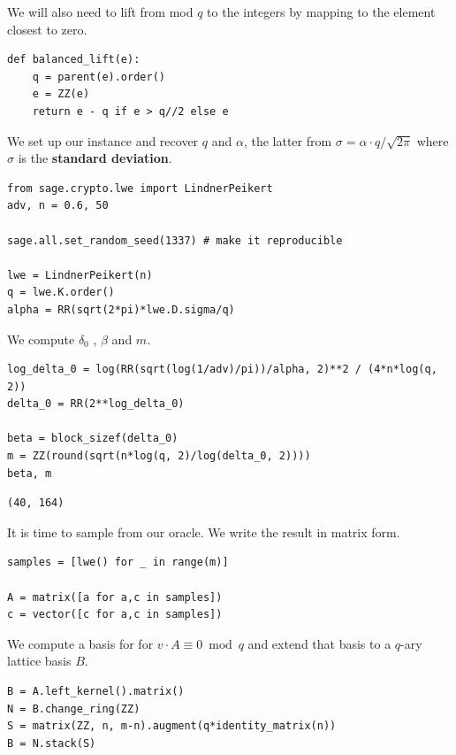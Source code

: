 \documentclass[10pt,a4paper,nobib]{tufte-handout}
\begin{document}
We will also need to lift from mod \(q\) to the integers by mapping to the element closest to zero.

\lstset{language=sage,label= ,caption= ,captionpos=b,numbers=none}
\begin{lstlisting}
def balanced_lift(e):
    q = parent(e).order()
    e = ZZ(e)
    return e - q if e > q//2 else e
\end{lstlisting}

We set up our instance and recover \(q\) and \(α\), the latter from \(σ = α⋅q/\sqrt{2π}\) where \(σ\) is the \textbf{standard deviation}.

\lstset{language=sage,label= ,caption= ,captionpos=b,numbers=none}
\begin{lstlisting}
from sage.crypto.lwe import LindnerPeikert
adv, n = 0.6, 50

sage.all.set_random_seed(1337) # make it reproducible

lwe = LindnerPeikert(n)
q = lwe.K.order()
alpha = RR(sqrt(2*pi)*lwe.D.sigma/q)
\end{lstlisting}

We compute \(δ_0\) , \(β\) and \(m\).

\lstset{language=sage,label= ,caption= ,captionpos=b,numbers=none}
\begin{lstlisting}
log_delta_0 = log(RR(sqrt(log(1/adv)/pi))/alpha, 2)**2 / (4*n*log(q, 2))
delta_0 = RR(2**log_delta_0)

beta = block_sizef(delta_0)
m = ZZ(round(sqrt(n*log(q, 2)/log(delta_0, 2))))
beta, m
\end{lstlisting}

\begin{verbatim}
(40, 164)
\end{verbatim}

It is time to sample from our oracle. We write the result in matrix form.

\lstset{language=sage,label= ,caption= ,captionpos=b,numbers=none}
\begin{lstlisting}
samples = [lwe() for _ in range(m)]

A = matrix([a for a,c in samples])
c = vector([c for a,c in samples])
\end{lstlisting}

We compute a basis for for \(v ⋅ A ≡ 0 \bmod q\) and extend that basis to a \(q\)-ary lattice basis \(B\).

\lstset{language=sage,label= ,caption= ,captionpos=b,numbers=none}
\begin{lstlisting}
B = A.left_kernel().matrix()
N = B.change_ring(ZZ)
S = matrix(ZZ, n, m-n).augment(q*identity_matrix(n))
B = N.stack(S)
\end{lstlisting}
\end{document}
